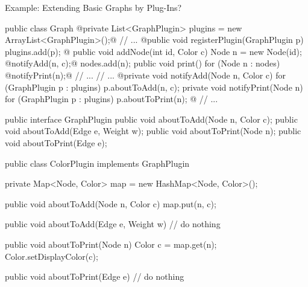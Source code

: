 \begin{frame}[fragile,label=GraphsWithPlugins]{Example: Extending Basic Graphs by Plug-Ins?}
	\begin{fancycolumns}
\begin{codetight}[basicstyle=\tiny]{}
public class Graph {
	@private List<GraphPlugin> plugins = new ArrayList<GraphPlugin>();@
	// ...	
	@public void registerPlugin(GraphPlugin p){
		plugins.add(p);
	}@
	public void addNode(int id, Color c){
		Node n = new Node(id);
		@notifyAdd(n, c);@
		nodes.add(n);
	}
	public void print() {
		for (Node n : nodes) {
			@notifyPrint(n);@
			// ...
		}
		// ...
	}
	@private void notifyAdd(Node n, Color c) {
		for (GraphPlugin p : plugins) {
			p.aboutToAdd(n, c);
		}
	}
	private void notifyPrint(Node n) {
		for (GraphPlugin p : plugins) {
			p.aboutToPrint(n);
		}
	}@
	// ...
}
\end{codetight}
		\nextcolumn
\begin{codetight}[basicstyle=\tiny]{}
public interface GraphPlugin {
	public void aboutToAdd(Node n, Color c);
	public void aboutToAdd(Edge e, Weight w);
	public void aboutToPrint(Node n);
	public void aboutToPrint(Edge e);
}
\end{codetight}
\begin{codetight}[basicstyle=\tiny]{}
public class ColorPlugin implements GraphPlugin {
	private Map<Node, Color> map = new HashMap<Node, Color>();

	public void aboutToAdd(Node n, Color c) {
		map.put(n, c);
	}
	
	public void aboutToAdd(Edge e, Weight w) {
		// do nothing
	}
	
	public void aboutToPrint(Node n) {
		Color c = map.get(n);
		Color.setDisplayColor(c);
	}
	
	public void aboutToPrint(Edge e) {
		// do nothing
	}
}
\end{codetight}
	\end{fancycolumns}
\end{frame}

